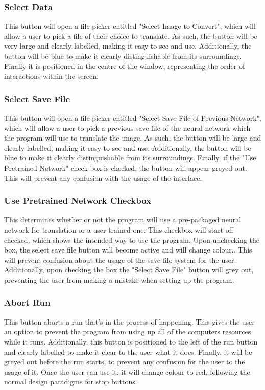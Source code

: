 \documentclass{report}
\begin{document}
\subsubsection{Select Data}
This button will open a file picker entitled "Select Image to Convert", which will allow a user to pick a file of their choice to translate. As such, the button will be very large and clearly labelled, making it easy to see and use. Additionally, the button will be blue to make it clearly distinguishable from its surroundings. Finally it is positioned in the centre of the window, representing the order of interactions within the screen.

\subsubsection{Select Save File}
This button will open a file picker entitled "Select Save File of Previous Network", which will allow a user to pick a previous save file of the neural network which the program will use to translate the image. As such, the button will be large and clearly labelled, making it easy to see and use. Additionally, the button will be blue to make it clearly distinguishable from its surroundings. Finally, if the "Use Pretrained Network" check box is checked, the button will appear greyed out. This will prevent any confusion with the usage of the interface.

\subsubsection{Use Pretrained Network Checkbox}
This determines whether or not the program will use a pre-packaged neural network for translation or a user trained one. This checkbox will start off checked, which shows the intended way to use the program. Upon unchecking the box, the select save file button will become active and will change colour,. This will prevent confusion about the usage of the save-file system for the user. Additionally, upon checking the box the "Select Save File" button will grey out, preventing the user from making a mistake when setting up the program.

\subsubsection{Abort Run}
This button aborts a run that's in the process of happening. This gives the user an option to prevent the program from using up all of the computers resources while it runs. Additionally, this button is positioned to the left of the run button and clearly labelled to make it clear to the user what it does. Finally, it will be greyed out before the run starts, to prevent any confusion for the user to the usage of it. Once the user can use it, it will change colour to red, following the normal design paradigms for stop buttons.
\end{document}
